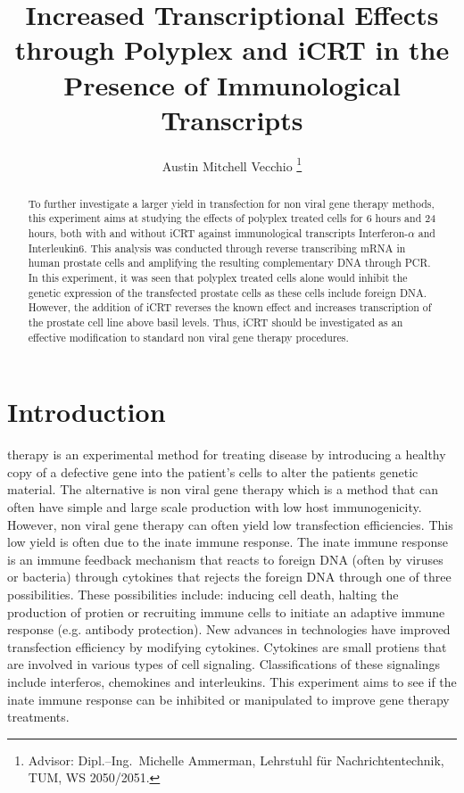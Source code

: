 \documentclass[journal, a4paper]{IEEEtran}
\begin{document}
\title{Increased Transcriptional Effects through Polyplex and iCRT in the Presence of Immunological Transcripts}
\author{Austin Mitchell Vecchio
\thanks{Advisor: Dipl.--Ing.~Michelle Ammerman, Lehrstuhl f\"ur Nachrichtentechnik, TUM, WS 2050/2051.}}
\maketitle

\begin{abstract}
  To further investigate a larger yield in transfection for non viral gene therapy methods, this experiment
  aims at studying the effects of polyplex treated cells for 6 hours and 24 hours, both with and without iCRT
  against immunological transcripts Interferon-$\alpha$ and Interleukin6. This analysis was conducted through
  reverse transcribing mRNA in human prostate cells and amplifying the resulting complementary DNA through PCR.
  In this experiment, it was seen that polyplex treated cells alone would inhibit the genetic expression of
  the transfected prostate cells as these cells include foreign DNA. However, the addition of iCRT reverses
  the known effect and increases transcription of the prostate cell line above basil levels. Thus, iCRT should
  be investigated as an effective modification to standard non viral gene therapy procedures.

\end{abstract}

\section{Introduction}
   therapy is an experimental method for treating disease by introducing a healthy copy of a
  defective gene into the patient's cells to alter the patients genetic material.
  The alternative is  non viral gene therapy which is a method that can often have simple and large scale production
  with low host immunogenicity. However, non viral gene therapy can often yield low transfection efficiencies.
  This low yield is often due to the inate immune response. The inate immune response is an immune feedback mechanism
  that reacts to foreign DNA (often by viruses or bacteria) through cytokines that rejects the foreign DNA through one of three possibilities.
  These possibilities include: inducing cell death, halting the production of protien or recruiting immune cells to initiate an adaptive immune
  response (e.g. antibody protection). New advances in technologies have improved transfection efficiency by modifying cytokines. Cytokines
  are small protiens that are involved in various types of cell signaling. Classifications of these signalings
  include interferos, chemokines and interleukins. This experiment aims to see if the inate immune response can be inhibited or manipulated
  to improve gene therapy treatments.
\end{document}
